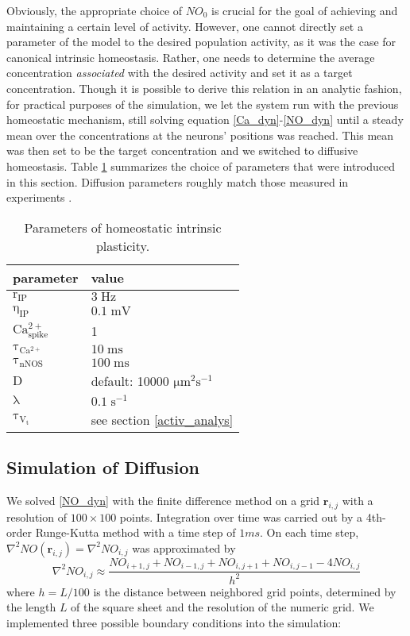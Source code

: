 \documentclass[10pt,a4paper]{article}
\begin{document}
Obviously, the appropriate choice of $NO_0$ is crucial for the goal of achieving and maintaining a certain level of activity. However, one cannot directly set a parameter of the model to the desired population activity, as it was the case for canonical intrinsic homeostasis. Rather, one needs to determine the average concentration \textit{associated} with the desired activity and set it as a target concentration. Though it is possible to derive this relation in an analytic fashion, for practical purposes of the simulation, we let the system run with the previous homeostatic mechanism, still solving equation \eqref{Ca_dyn}-\eqref{NO_dyn} until a steady mean over the concentrations at the neurons' positions was reached. This mean was then set to be the target concentration and we switched to diffusive homeostasis. Table \ref{Params_IP} summarizes the choice of parameters that were introduced in this section. Diffusion parameters roughly match those measured in experiments \cite{Philippides_2000}.
\begin{table}
\begin{tabular}{|l|l|}
\hline
\textbf{parameter} & \textbf{value} \\
\hline
$\mathrm{r_{IP}}$ & $\mathrm{3\;Hz}$ \\
\hline
$\mathrm{\eta_{IP}}$ & $\mathrm{0.1\;mV}$ \\
\hline
$\mathrm{Ca^{2+}_{spike}}$ & 1 \\ \hline
$\mathrm{\tau_{Ca^{2+}}}$ &  $\mathrm{10\;ms}$ \\
\hline
$\mathrm{\tau_{nNOS}}$ & $\mathrm{100\;ms}$ \\
\hline
$\mathrm{D}$ & default: 10000 $\mathrm{\mu m^2 s^{-1}}$ \\
\hline 
$\mathrm{\lambda}$ & $\mathrm{0.1\;s^{-1}}$ \\
\hline
$\mathrm{\tau_{V_t}}$ & see section \ref{activ_analys} \\
\hline
\end{tabular}
\caption{Parameters of homeostatic intrinsic plasticity.}
\label{Params_IP}
\end{table}

\subsection{Simulation of Diffusion}

We solved \eqref{NO_dyn} with the finite difference method on a grid $\mathbf{r}_{i,j}$ with a resolution of $100\times 100$ points. Integration over time was carried out by a 4th-order Runge-Kutta method with a time step of $1 ms$. On each time step, $\nabla^2 NO(\mathbf{r}_{i,j}) = \nabla^2 NO_{i,j}$ was approximated by
\begin{equation}
\nabla^2 NO_{i,j} \approx \frac{NO_{i+1,j}+NO_{i-1,j}+NO_{i,j+1}+NO_{i,j-1}-4NO_{i,j}}{h^2}
\label{Laplace_Numeric}
\end{equation}
where $h = L/100$ is the distance between neighbored grid points, determined by the length $L$ of the square sheet and the resolution of the numeric grid. We implemented three possible boundary conditions into the simulation:
\end{document}
